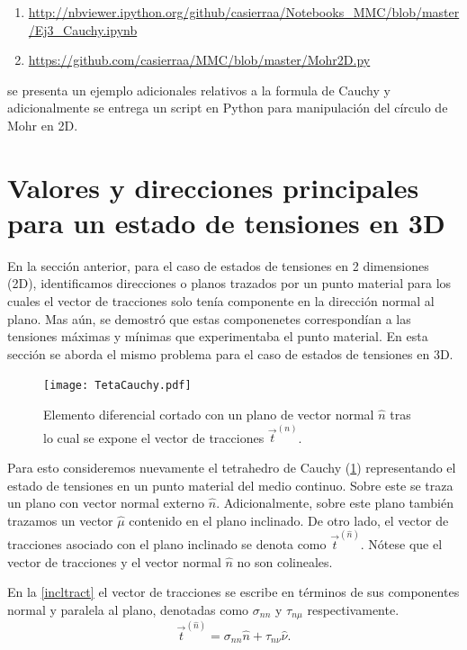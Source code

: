\documentclass[../notas medios.tex]{subfiles}
\begin{document}
\begin{enumerate} 
\item {\url{http://nbviewer.ipython.org/github/casierraa/Notebooks_MMC/blob/master/Ej3_Cauchy.ipynb}}

\item  {\url{https://github.com/casierraa/MMC/blob/master/Mohr2D.py}} 
\end{enumerate}

se presenta un ejemplo adicionales relativos a la formula de Cauchy y  adicionalmente se entrega un script en Python para manipulación del círculo de Mohr en 2D.

\section{Valores y direcciones principales para un estado de tensiones en 3D}
En la sección anterior, para el caso de estados de tensiones en 2 dimensiones (2D), identificamos direcciones o planos trazados por un punto material para los cuales el vector de tracciones solo tenía componente en la dirección normal al plano. Mas aún, se demostró que estas componenetes correspondían a las tensiones máximas y mínimas que experimentaba el punto material. En esta sección se aborda el mismo problema para el caso de estados de tensiones en 3D.  
%
\begin{figure}[H]
\centering
	\texttt{[image: TetaCauchy.pdf]}
	\caption{Elemento diferencial cortado con un plano de vector normal $\hat{n}$ tras lo cual se expone el vector de tracciones ${{\vec t}^{(n)}}$.}
	\label{TetaCauchy}
\end{figure}

Para esto consideremos nuevamente el tetrahedro de Cauchy (\cref{TetaCauchy}) representando el estado de tensiones en un punto material del medio continuo. Sobre este se traza un plano con vector normal externo $\hat{n}$. Adicionalmente, sobre este plano también trazamos un vector ${\hat \mu }$ contenido en el plano inclinado. De otro lado, el vector de tracciones asociado con el plano inclinado se denota como ${\vec t^{(\hat n)}}$. Nótese que el vector de tracciones y el vector normal $\hat{n}$ no son colineales.

En la \cref{incltract} el vector de tracciones se escribe en términos de sus componentes normal y paralela al plano, denotadas como ${\sigma _{nn}}$ y ${\tau _{n\mu }}$ respectivamente.
%
\begin{equation}
{{\vec t}^{(\hat n)}} = {\sigma _{nn}}\hat n + {\tau _{n\nu }}\hat \nu.
\label{incltract}
\end{equation}
\end{document}
